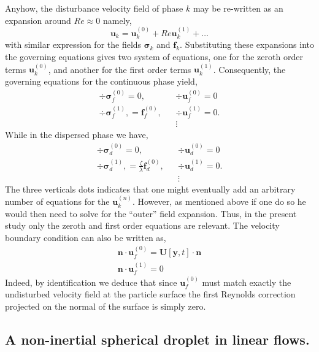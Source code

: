 Anyhow, the disturbance velocity field of phase $k$ may be re-written as an expansion around $Re \approx 0$ namely, 
\begin{equation*}
    \textbf{u}_k = \textbf{u}_k^{(0)} + Re \textbf{u}_k^{(1)} + \ldots
\end{equation*}
with similar expression for the fields $\bm\sigma_k$ and $\textbf{f}_k$. 
Substituting these expansions into the governing equations gives two system of equations, one for the zeroth order terms $\textbf{u}^{(0)}_k$, and another for the first order terms $\textbf{u}^{(1)}_k$. 
Consequently, the governing equations for the continuous phase yield, 
\begin{align}
    \div\bm\sigma_f^{(0)}
    = 0,
    && \div \textbf{u}_f^{(0)} = 0 
    \label{eq:zeroth_order_NS_f}
    \\
    \div\bm\sigma_f^{(1)},
    =  \textbf{f}_f^{(0)},
    && \div \textbf{u}_f^{(1)} = 0.  
    \label{eq:first_order_NS_f}
    \\
    &&\vdots
\end{align}
While in the dispersed phase we have, 
\begin{align}
    \div\bm\sigma_d^{(0)}
    = 0,
    && \div \textbf{u}_d^{(0)} = 0 
    \label{eq:zeroth_order_NS_d}
    \\
    \div\bm\sigma_d^{(1)},
    = \frac{\zeta}{\lambda} \textbf{f}_d^{(0)},
    && \div \textbf{u}_d^{(1)} = 0. 
    \label{eq:first_order_NS_f}
    \\
    &&\vdots
\end{align}
The three verticals dots indicates that one might eventually add an arbitrary number of equations for the $\textbf{u}^{(n)}_k$. 
However, as mentioned above if one do so he would then need to solve for the ``outer'' field  expansion. 
Thus, in the present study only the zeroth and first order equations are relevant. 
The velocity boundary condition can also be written as, 
\begin{align}
    \textbf{n}\cdot\textbf{u}_f^{(0)}
    = \textbf{U}[\textbf{y},t]\cdot \textbf{n} \\
    \textbf{n}\cdot\textbf{u}_f^{(1)}
    = 0
    \label{eq:bc_inertial}
\end{align}
Indeed, by identification we deduce that since $\textbf{u}_f^{(0)}$ must match exactly the undisturbed velocity field at the particle surface the first Reynolds correction projected on the normal of the surface is simply zero.

\subsection{A non-inertial spherical droplet in linear flows.}

